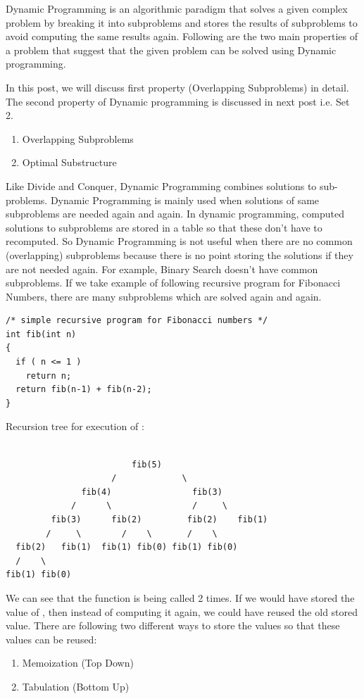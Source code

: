 Dynamic Programming is an algorithmic paradigm that solves a given complex
problem by breaking it into subproblems and stores the results of
subproblems to avoid computing the same results again. Following are the two
main properties of a problem that suggest that the given problem can be
solved using Dynamic programming.

In this post, we will discuss first property (Overlapping Subproblems) in
detail. The second property of Dynamic programming is discussed in next post
i.e. Set 2.

\begin{enumerate}[label=\textbf{\arabic*.}]
\item Overlapping Subproblems
\item Optimal Substructure
\end{enumerate}


Like Divide and Conquer, Dynamic Programming combines solutions to
sub-problems. Dynamic Programming is mainly used when solutions of same
subproblems are needed again and again. In dynamic programming, computed
solutions to subproblems are stored in a table so that these don't have to
recomputed. So Dynamic Programming is not useful when there are no common
(overlapping) subproblems because there is no point storing the solutions if
they are not needed again. For example, Binary Search doesn't have common
subproblems. If we take example of following recursive program for Fibonacci
Numbers, there are many subproblems which are solved again and again.
\begin{lstlisting}[style=raycppnewsnippet]
/* simple recursive program for Fibonacci numbers */
int fib(int n)
{
  if ( n <= 1 )
    return n;
  return fib(n-1) + fib(n-2);
}
\end{lstlisting}

Recursion tree for execution of :
\begin{lstlisting}[style=pseudostyle, numbers=none]
                              
                         fib(5)
                     /             \
               fib(4)                fib(3)
             /      \                /     \
         fib(3)      fib(2)         fib(2)    fib(1)
        /     \        /    \       /    \
  fib(2)   fib(1)  fib(1) fib(0) fib(1) fib(0)
  /    \
fib(1) fib(0)
\end{lstlisting}

We can see that the function  is being called 2 times. If we
would have stored the value of , then instead of computing it
again, we could have reused the old stored value. There are following two
different ways to store the values so that these values can be reused:
\begin{enumerate}[label=\textbf{\alph*.}]
\item Memoization (Top Down)
\item Tabulation (Bottom Up)
\end{enumerate}

